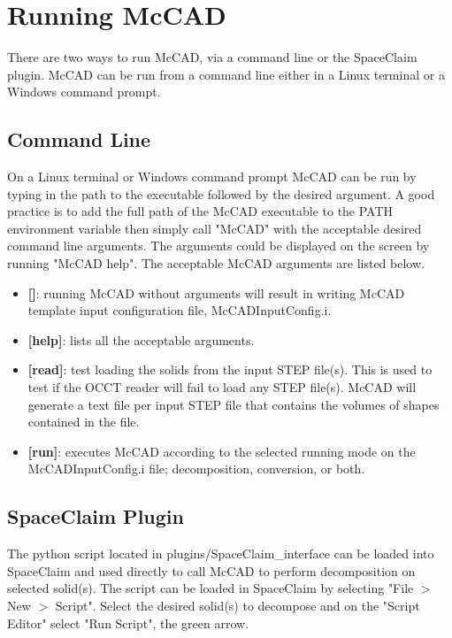 \documentclass[12pt, a4paper, titlepage]{article}
\begin{document}
\section{Running McCAD} \label{sec:Running McCAD}
There are two ways to run McCAD, via a command line or the SpaceClaim plugin. McCAD can be run from a command line either in a Linux terminal or a Windows command prompt.

  \subsection{Command Line}
    On a Linux terminal or Windows command prompt McCAD can be run by typing in the path to the executable followed by the desired argument. A good practice is to add the full path of the McCAD executable to the PATH environment variable then simply call "McCAD" with the acceptable desired command line arguments. The arguments could be displayed on the screen by running "McCAD help". The acceptable McCAD arguments are listed below.
    \begin{itemize}
      \item \textbf{[]}: running McCAD without arguments will result in writing McCAD template input configuration file, McCADInputConfig.i.
      \item \textbf{[help]}: lists all the acceptable arguments.
      \item \textbf{[read]}: test loading the solids from the input STEP file(s). This is used to test if the OCCT reader will fail to load any STEP file(s). McCAD will generate a text file per input STEP file that contains the volumes of shapes contained in the file.
      \item \textbf{[run]}: executes McCAD according to the selected running mode on the McCADInputConfig.i file; decomposition, conversion, or both. 
    \end{itemize}

  \subsection{SpaceClaim Plugin}
    The python script located in plugins/SpaceClaim\_interface can be loaded into SpaceClaim and used directly to call McCAD to perform decomposition on selected solid(s).  The script can be loaded in SpaceClaim by selecting "File $>$ New $>$ Script". Select the desired solid(s) to decompose and on the "Script Editor" select "Run Script", the green arrow.
\end{document}
